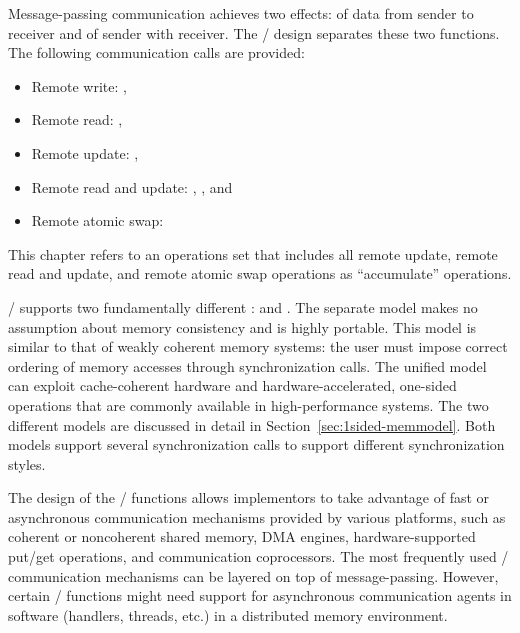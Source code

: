 Message-passing communication achieves two effects:
 of data from sender to
receiver and 
 of sender 
with receiver.
The \RMA/ design separates these two functions.
The following communication calls are provided:
\begin{itemize}
\item Remote write: , 
\item Remote read: , 
\item Remote update: , 
\item Remote read and update: , ,
and 
\item Remote atomic swap: 
\end{itemize}
This chapter refers to an operations set that includes all remote update,
remote read and update, and remote atomic swap operations as
``accumulate'' operations.

\MPI/ supports two fundamentally different :
and .
The separate model makes no assumption about memory consistency and is
highly portable. This model is similar to that of weakly coherent memory
systems: the user must impose correct ordering of memory accesses
through synchronization calls. The
unified model can exploit cache-coherent hardware and
hardware-accelerated, one-sided operations that are commonly available
in high-performance systems.
The two different models are discussed in detail in
Section~\ref{sec:1sided-memmodel}.
Both models support several synchronization calls to support
different synchronization styles.

The design of the \RMA/ functions allows implementors to take 
advantage of fast or asynchronous communication mechanisms provided by various
platforms, such as coherent or noncoherent shared memory, DMA
engines, hardware-supported put/get operations, and communication
coprocessors.  The most frequently used \RMA/
communication mechanisms can be layered on top of message-passing.  
However, certain 
\RMA/ functions might need support for asynchronous communication agents in
software (handlers, threads, etc.) in a distributed memory environment.

